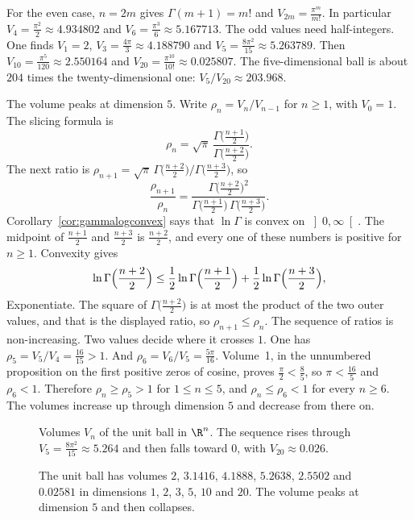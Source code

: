 For the even case, $n=2m$ gives $\Gamma(m+1)=m!$ and $V_{2m}=\frac{\pi^m}{m!}$. In particular $V_4=\frac{\pi^2}2\approx4.934802$ and $V_6=\frac{\pi^3}6\approx5.167713$. The odd values need half-integers. One finds $V_1=2$, $V_3=\frac{4\pi}3\approx4.188790$ and $V_5=\frac{8\pi^2}{15}\approx5.263789$. Then $V_{10}=\frac{\pi^5}{120}\approx2.550164$ and $V_{20}=\frac{\pi^{10}}{10!}\approx0.025807$. The five-dimensional ball is about $204$ times the twenty-dimensional one: $V_5/V_{20}\approx203.968$.

The volume peaks at dimension $5$. Write $\rho_n=V_n/V_{n-1}$ for $n\ge1$, with $V_0=1$. The slicing formula is
\[
\rho_n=\sqrt\pi\,\frac{\Gamma\bigl(\frac{n+1}2\bigr)}{\Gamma\bigl(\frac{n+2}2\bigr)}.
\]
The next ratio is $\rho_{n+1}=\sqrt\pi\,\Gamma\bigl(\frac{n+2}2\bigr)\big/\Gamma\bigl(\frac{n+3}2\bigr)$, so
\[
\frac{\rho_{n+1}}{\rho_n}=\frac{\Gamma\bigl(\frac{n+2}2\bigr)^2}{\Gamma\bigl(\frac{n+1}2\bigr)\,\Gamma\bigl(\frac{n+3}2\bigr)}.
\]
Corollary~\ref{cor:gammalogconvex} says that $\ln\Gamma$ is convex on $\left]0,\infty\right[$. The midpoint of $\frac{n+1}2$ and $\frac{n+3}2$ is $\frac{n+2}2$, and every one of these numbers is positive for $n\ge1$. Convexity gives
\[
\ln\Gamma\Bigl(\frac{n+2}2\Bigr)\le\frac12\ln\Gamma\Bigl(\frac{n+1}2\Bigr)+\frac12\ln\Gamma\Bigl(\frac{n+3}2\Bigr),
\]
Exponentiate. The square of $\Gamma\bigl(\frac{n+2}2\bigr)$ is at most the product of the two outer values, and that is the displayed ratio, so $\rho_{n+1}\le\rho_n$. The sequence of ratios is non-increasing. Two values decide where it crosses $1$. One has $\rho_5=V_5/V_4=\frac{16}{15}>1$. And $\rho_6=V_6/V_5=\frac{5\pi}{16}$. Volume~1, in the unnumbered proposition on the first positive zeros of cosine, proves $\frac\pi2<\frac85$, so $\pi<\frac{16}5$ and $\rho_6<1$. Therefore $\rho_n\ge\rho_5>1$ for $1\le n\le5$, and $\rho_n\le\rho_6<1$ for every $n\ge6$. The volumes increase up through dimension $5$ and decrease from there on.

\begin{figure}[ht]
\centering
{}
\caption{Volumes $V_n$ of the unit ball in $\R^n$. The sequence rises through $V_5=\frac{8\pi^2}{15}\approx5.264$ and then falls toward $0$, with $V_{20}\approx0.026$.}
\label{fig:ball}
\end{figure}

\begin{figure}[ht]
\centering
{}
\caption{The unit ball has volumes $2$, $3.1416$, $4.1888$, $5.2638$, $2.5502$ and $0.02581$ in dimensions $1$, $2$, $3$, $5$, $10$ and $20$. The volume peaks at dimension $5$ and then collapses.}
\label{fig:rw05-balls}
\end{figure}

